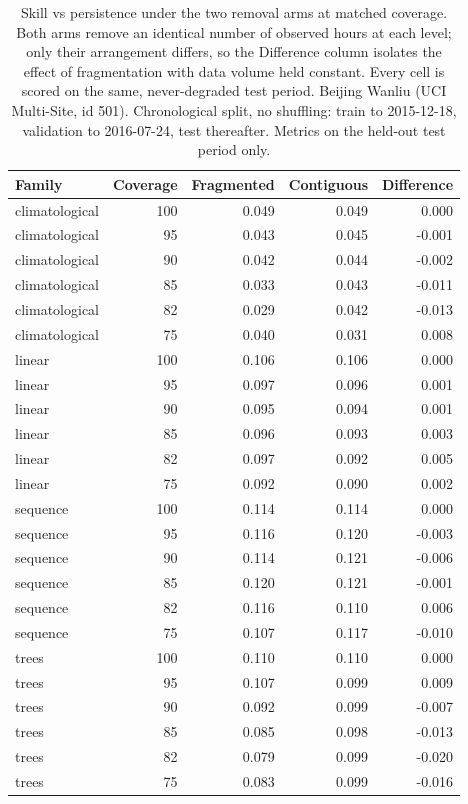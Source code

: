 \begin{table}[htbp]
\caption{Skill vs persistence under the two removal arms at matched coverage. Both arms remove an identical number of observed hours at each level; only their arrangement differs, so the Difference column isolates the effect of fragmentation with data volume held constant. Every cell is scored on the same, never-degraded test period. Beijing Wanliu (UCI Multi-Site, id 501). Chronological split, no shuffling: train to 2015-12-18, validation to 2016-07-24, test thereafter. Metrics on the held-out test period only.}
\label{tab:ablation_arm_gap}
\begin{tabular}{lrrrr}
\toprule
Family & Coverage & Fragmented & Contiguous & Difference \\
\midrule
climatological & 100 & 0.049 & 0.049 & 0.000 \\
climatological & 95 & 0.043 & 0.045 & -0.001 \\
climatological & 90 & 0.042 & 0.044 & -0.002 \\
climatological & 85 & 0.033 & 0.043 & -0.011 \\
climatological & 82 & 0.029 & 0.042 & -0.013 \\
climatological & 75 & 0.040 & 0.031 & 0.008 \\
linear & 100 & 0.106 & 0.106 & 0.000 \\
linear & 95 & 0.097 & 0.096 & 0.001 \\
linear & 90 & 0.095 & 0.094 & 0.001 \\
linear & 85 & 0.096 & 0.093 & 0.003 \\
linear & 82 & 0.097 & 0.092 & 0.005 \\
linear & 75 & 0.092 & 0.090 & 0.002 \\
sequence & 100 & 0.114 & 0.114 & 0.000 \\
sequence & 95 & 0.116 & 0.120 & -0.003 \\
sequence & 90 & 0.114 & 0.121 & -0.006 \\
sequence & 85 & 0.120 & 0.121 & -0.001 \\
sequence & 82 & 0.116 & 0.110 & 0.006 \\
sequence & 75 & 0.107 & 0.117 & -0.010 \\
trees & 100 & 0.110 & 0.110 & 0.000 \\
trees & 95 & 0.107 & 0.099 & 0.009 \\
trees & 90 & 0.092 & 0.099 & -0.007 \\
trees & 85 & 0.085 & 0.098 & -0.013 \\
trees & 82 & 0.079 & 0.099 & -0.020 \\
trees & 75 & 0.083 & 0.099 & -0.016 \\
\bottomrule
\end{tabular}
\end{table}
